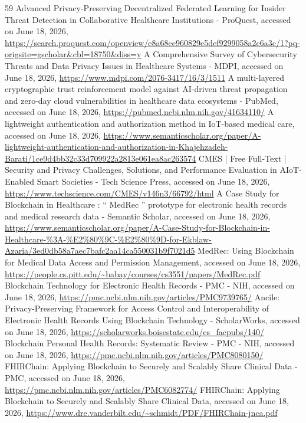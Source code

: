 \documentclass[12pt]{article}
\begin{document}
\begin{sloppypar}
\begin{thebibliography}{59}
 Advanced Privacy-Preserving Decentralized Federated Learning for Insider Threat Detection in Collaborative Healthcare Institutions - ProQuest, accessed on June 18, 2026, \url{https://search.proquest.com/openview/e8a68ee960829e5def9299058a2c6a3c/1?pq-origsite=gscholar&cbl=18750&diss=y}
 A Comprehensive Survey of Cybersecurity Threats and Data Privacy Issues in Healthcare Systems - MDPI, accessed on June 18, 2026, \url{https://www.mdpi.com/2076-3417/16/3/1511}
 A multi-layered cryptographic trust reinforcement model against AI-driven threat propagation and zero-day cloud vulnerabilities in healthcare data ecosystems - PubMed, accessed on June 18, 2026, \url{https://pubmed.ncbi.nlm.nih.gov/41634110/}
 A lightweight authentication and authorization method in IoT-based medical care, accessed on June 18, 2026, \url{https://www.semanticscholar.org/paper/A-lightweight-authentication-and-authorization-in-Khajehzadeh-Barati/1ce9d4bb32c33d709922a2813e061ea8ac263574}
 CMES | Free Full-Text | Security and Privacy Challenges, Solutions, and Performance Evaluation in AIoT-Enabled Smart Societies - Tech Science Press, accessed on June 18, 2026, \url{https://www.techscience.com/CMES/v146n3/66792/html}
 A Case Study for Blockchain in Healthcare : “ MedRec ” prototype for electronic health records and medical research data - Semantic Scholar, accessed on June 18, 2026, \url{https://www.semanticscholar.org/paper/A-Case-Study-for-Blockchain-in-Healthcare-%3A-%E2%80%9C-%E2%80%9D-for-Ekblaw-Azaria/3ed0db58a7aec7bafc2aa14ca550031b9f7021d5}
 MedRec: Using Blockchain for Medical Data Access and Permission Management, accessed on June 18, 2026, \url{https://people.cs.pitt.edu/~babay/courses/cs3551/papers/MedRec.pdf}
 Blockchain Technology for Electronic Health Records - PMC - NIH, accessed on June 18, 2026, \url{https://pmc.ncbi.nlm.nih.gov/articles/PMC9739765/}
 Ancile: Privacy-Preserving Framework for Access Control and Interoperability of Electronic Health Records Using Blockchain Technology - ScholarWorks, accessed on June 18, 2026, \url{https://scholarworks.boisestate.edu/cs_facpubs/140/}
 Blockchain Personal Health Records: Systematic Review - PMC - NIH, accessed on June 18, 2026, \url{https://pmc.ncbi.nlm.nih.gov/articles/PMC8080150/}
 FHIRChain: Applying Blockchain to Securely and Scalably Share Clinical Data - PMC, accessed on June 18, 2026, \url{https://pmc.ncbi.nlm.nih.gov/articles/PMC6082774/}
 FHIRChain: Applying Blockchain to Securely and Scalably Share Clinical Data, accessed on June 18, 2026, \url{https://www.dre.vanderbilt.edu/~schmidt/PDF/FHIRChain-jnca.pdf}

\end{thebibliography}
\end{sloppypar}
\end{document}
